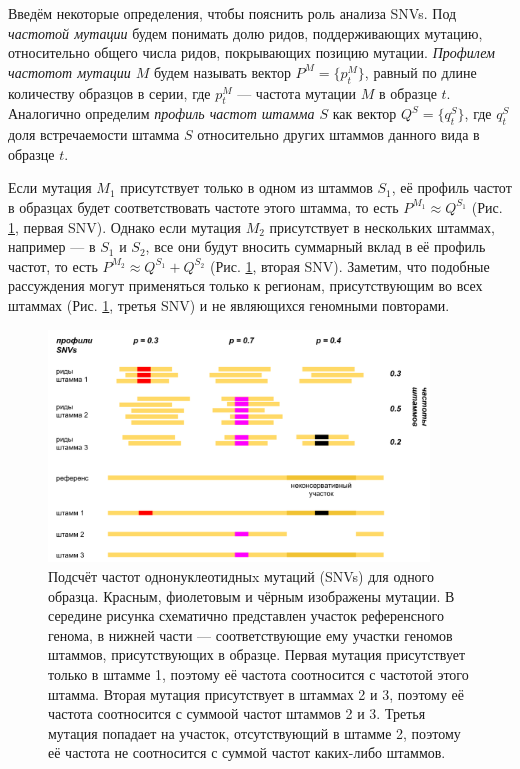 \documentclass{spbau-diploma}
\begin{document}
Введём некоторые определения, чтобы пояснить роль анализа SNVs. Под \textit{частотой мутации} будем понимать долю ридов, поддерживающих мутацию, относительно общего числа ридов, покрывающих позицию мутации. 
\textit{Профилем частотот мутации $M$} будем называть вектор $P^M=\{p_t^M\}$, равный по длине количеству образцов в серии, где $p_t^M$ --- частота мутации $M$ в образце $t$.
Аналогично определим \textit{профиль частот штамма $S$} как вектор  $Q^S=\{q_t^S\}$, где $q^S_t$ доля встречаемости штамма $S$ относительно других штаммов данного вида в образце $t$.

Если мутация $M_1$ присутствует только в одном из штаммов $S_1$, её профиль частот в образцах будет соответствовать частоте этого штамма, то есть $P^{M_1} \approx Q^{S_1}$ (Рис. \ref{snv_profile}, первая SNV). 
Однако если мутация $M_2$ присутствует в нескольких штаммах, например --- в $S_1$ и $S_2$, все они будут вносить суммарный вклад в её профиль частот, то есть $P^{M_2} \approx Q^{S_1} + Q^{S_2}$ (Рис. \ref{snv_profile}, вторая SNV). 
Заметим, что подобные рассуждения могут применяться только к регионам, присутствующим во всех штаммах (Рис. \ref{snv_profile}, третья SNV) и не являющихся геномными повторами. 


\begin{figure}[t]
\centering
\includegraphics[width=0.9\textwidth]{pics/snv_profiles.png}
\caption{Подсчёт частот однонуклеотидныx мутаций (SNVs) для одного образца. Красным, фиолетовым и чёрным изображены мутации. В середине рисунка схематично представлен участок референсного генома, в нижней части --- соответствующие ему участки геномов штаммов, присутствующих в образце. Первая мутация присутствует только в штамме 1, поэтому её частота соотносится с частотой этого штамма. Вторая мутация присутствует в штаммах 2 и 3, поэтому её частота соотносится с суммоой частот штаммов 2 и 3. Третья мутация попадает на участок, отсутствующий в штамме 2, поэтому её частота не соотносится с суммой частот каких-либо штаммов.}
\label{snv_profile}
\end{figure}
\end{document}
